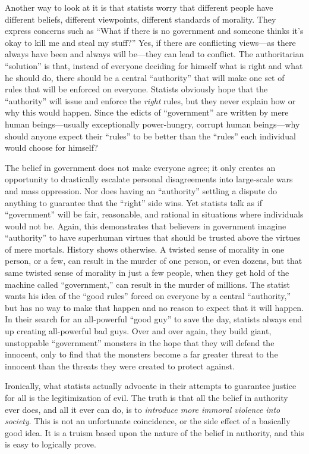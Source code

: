 \documentclass{book}
\begin{document}
Another way to look at it is that statists worry that different people have different beliefs, different viewpoints, different standards of morality. They express concerns such as \enquote{What if there is no government and someone thinks it's okay to kill me and steal my stuff?} Yes, if there are conflicting views---as there always have been and always will be---they can lead to conflict. The authoritarian \enquote{solution} is that, instead of everyone deciding for himself what is right and what he should do, there should be a central \enquote{authority} that will make one set of rules that will be enforced on everyone. Statists obviously hope that the \enquote{authority} will issue and enforce the \emph{right} rules, but they never explain how or why this would happen. Since the edicts of \enquote{government} are written by mere human beings---usually exceptionally power-hungry, corrupt human beings---why should anyone expect their \enquote{rules} to be better than the \enquote{rules} each individual would choose for himself?

The belief in government does not make everyone agree; it only creates an opportunity to drastically escalate personal disagreements into large-scale wars and mass oppression. Nor does having an \enquote{authority} settling a dispute do anything to guarantee that the \enquote{right} side wins. Yet statists talk as if \enquote{government} will be fair, reasonable, and rational in situations where individuals would not be. Again, this demonstrates that believers in government imagine \enquote{authority} to have superhuman virtues that should be trusted above the virtues of mere mortals. History shows otherwise. A twisted sense of morality in one person, or a few, can result in the murder of one person, or even dozens, but that same twisted sense of morality in just a few people, when they get hold of the machine called \enquote{government,} can result in the murder of millions. The statist wants his idea of the \enquote{good rules} forced on everyone by a central \enquote{authority,} but has no way to make that happen and no reason to expect that it will happen. In their search for an all-powerful \enquote{good guy} to save the day, statists always end up creating all-powerful bad guys. Over and over again, they build giant, unstoppable \enquote{government} monsters in the hope that they will defend the innocent, only to find that the monsters become a far greater threat to the innocent than the threats they were created to protect against.

Ironically, what statists actually advocate in their attempts to guarantee justice for all is the legitimization of evil. The truth is that all the belief in authority ever does, and all it ever can do, is to \emph{introduce more immoral violence into society}. This is not an unfortunate coincidence, or the side effect of a basically good idea. It is a truism based upon the nature of the belief in authority, and this is easy to logically prove.
\end{document}
